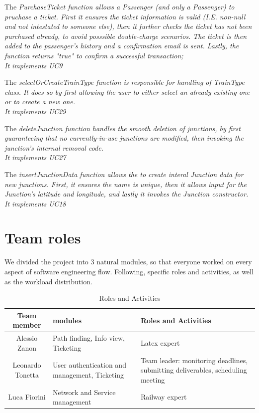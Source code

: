 The \it{PurchaseTicket} function allows a Passenger (and only a Passenger) to pruchase a ticket.
First it ensures the ticket information is valid (I.E. non-null and not intestated to someone else), then it further checks the ticket has not been purchased already, to avoid posssible double-charge scenarios.
The ticket is then added to the passenger's history and a confirmation email is sent.
Lastly, the function returns "true" to confirm a successful transaction;\\
It implements UC9

The \it{selectOrCreateTrainType} function is responsible for handling of \it{TrainType} class. 
It does so by first allowing the user to either select an already existing one or to create a new one.\\
It implements UC29

The \it{deleteJunction} function handles the smooth deletion of junctions, by first guaranteeing that no currently-in-use junctions are modified, then invoking the junction's internal removal code.\\
It implements UC27

The \it{insertJunctionData} function allows the  to create interal Junction data for new junctions.
First, it ensures the name is unique, then it allows input for the Junction's latitude and longitude, and lastly it invokes the Junction constructor.\\
It implements UC18

\section{Team roles}\label{Team roles}

We divided the project into 3 natural modules, so that everyone worked on every aspect of software engineering flow. Following, specific roles and activities, as well as the workload distribution.

\begin{table}[h]
\centering
\caption{Roles and Activities}
\label{tab:roles}

\begin{tabular}{c|p{5cm}|p{5cm}}
\hline
\textbf{Team member} & \textbf{modules} & \textbf{Roles and Activities}\\
\hline
Alessio Zanon & Path finding, Info view, Ticketing & Latex expert\\
\hline
Leonardo Tonetta & User authentication and management, Ticketing & Team leader: monitoring deadlines, submitting deliverables, scheduling meeting\\
\hline
Luca Fiorini & Network and Service management & Railway expert\\
\end{tabular}

\end{table}

